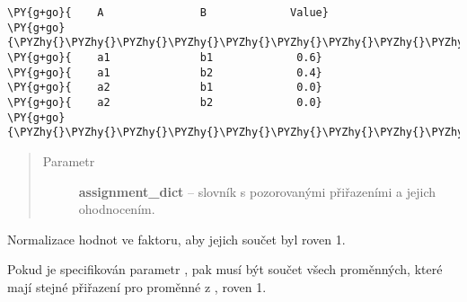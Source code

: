 \begin{fulllineitems}
\begin{fulllineitems}
\begin{Verbatim}[commandchars=\\\{\}]
\PY{g+go}{    A               B             Value}
\PY{g+go}{\PYZhy{}\PYZhy{}\PYZhy{}\PYZhy{}\PYZhy{}\PYZhy{}\PYZhy{}\PYZhy{}\PYZhy{}\PYZhy{}\PYZhy{}\PYZhy{}\PYZhy{}\PYZhy{}\PYZhy{}\PYZhy{}\PYZhy{}\PYZhy{}\PYZhy{}\PYZhy{}\PYZhy{}\PYZhy{}\PYZhy{}\PYZhy{}\PYZhy{}\PYZhy{}\PYZhy{}\PYZhy{}\PYZhy{}\PYZhy{}\PYZhy{}\PYZhy{}\PYZhy{}\PYZhy{}\PYZhy{}\PYZhy{}\PYZhy{}\PYZhy{}\PYZhy{}\PYZhy{}\PYZhy{}\PYZhy{}\PYZhy{}\PYZhy{}\PYZhy{}\PYZhy{}\PYZhy{}\PYZhy{}\PYZhy{}\PYZhy{}}
\PY{g+go}{    a1              b1             0.6}
\PY{g+go}{    a1              b2             0.4}
\PY{g+go}{    a2              b1             0.0}
\PY{g+go}{    a2              b2             0.0}
\PY{g+go}{\PYZhy{}\PYZhy{}\PYZhy{}\PYZhy{}\PYZhy{}\PYZhy{}\PYZhy{}\PYZhy{}\PYZhy{}\PYZhy{}\PYZhy{}\PYZhy{}\PYZhy{}\PYZhy{}\PYZhy{}\PYZhy{}\PYZhy{}\PYZhy{}\PYZhy{}\PYZhy{}\PYZhy{}\PYZhy{}\PYZhy{}\PYZhy{}\PYZhy{}\PYZhy{}\PYZhy{}\PYZhy{}\PYZhy{}\PYZhy{}\PYZhy{}\PYZhy{}\PYZhy{}\PYZhy{}\PYZhy{}\PYZhy{}\PYZhy{}\PYZhy{}\PYZhy{}\PYZhy{}\PYZhy{}\PYZhy{}\PYZhy{}\PYZhy{}\PYZhy{}\PYZhy{}\PYZhy{}\PYZhy{}\PYZhy{}\PYZhy{}}
\end{Verbatim}
\begin{quote}\begin{description}
\item[{Parametr}] \leavevmode
\textbf{assignment\_dict} -- slovník s pozorovanými přiřazeními a jejich ohodnocením.

\end{description}\end{quote}

\end{fulllineitems}


\begin{fulllineitems}
\label{alex.infer:alex.infer.factor.Factor.normalize}
Normalizace hodnot ve faktoru, aby jejich součet byl roven 1.

Pokud je specifikován parametr , pak musí být součet všech
proměnných, které mají stejné přiřazení pro proměnné z , roven
1.


\end{fulllineitems}
\end{fulllineitems}
